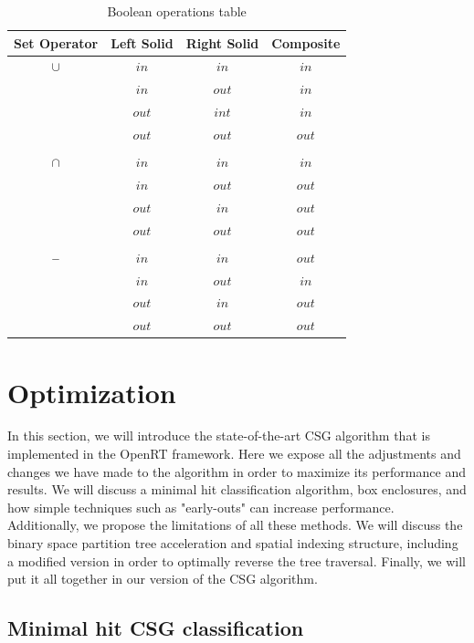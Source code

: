 \documentclass[a4paper,11pt,oneside]{article}
\newcommand{\minus}{\scalebox{0.9}[1.0]{$-$}} %
\begin{document}
\begin{table}[h]
	\centering
	\caption{Boolean operations table}
	\label{section3:boolean_algebra}
	\begin{tabular}{||c c c c||} 
		\hline
		Set Operator & Left Solid & Right Solid  & Composite \\ [0.5ex] 
		\hline\hline
		$\cup$    & $in$ & $in$ & $in$  \\
		    	  & $in$ & $out$ & $in$  \\
		    	  & $out$ & $int$ & $in$  \\
		 	   	  & $out$ & $out$ & $out$  \\
		& & & \\
		$\cap$    & $in$ & $in$ & $in$  \\
		    	  & $in$ & $out$ & $out$  \\
		    	  & $out$ & $in$ & $out$  \\
		 	   	  & $out$ & $out$ & $out$  \\
		& & & \\
		$\minus$ & $in$ & $in$ & $out$  \\
		    	  & $in$ & $out$ & $in$  \\
		    	  & $out$ & $in$ & $out$  \\
		 	   	  & $out$ & $out$ & $out$  \\		 	   	
		\hline
	\end{tabular}
\end{table}

\section{Optimization}

In this section, we will introduce the state-of-the-art CSG algorithm that is implemented in the OpenRT framework. Here we expose all the adjustments and changes we have made to the algorithm in order to maximize its performance and results. We will discuss a minimal hit classification algorithm, box enclosures, and how simple techniques such as "early-outs" can increase performance. Additionally, we propose the limitations of all these methods. We will discuss the binary space partition tree acceleration and spatial indexing structure, including a modified version in order to optimally reverse the tree traversal. Finally, we will put it all together in our version of the CSG algorithm.

\subsection{Minimal hit CSG classification}
\label{section:classification-optimization}
\end{document}
